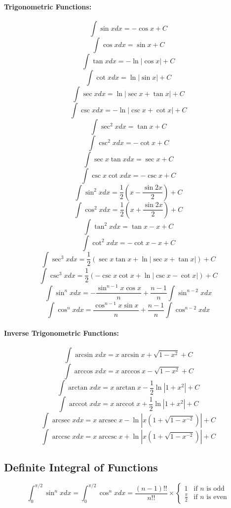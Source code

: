 \documentclass{article}
\begin{document}
\paragraph{Trigonometric Functions:}
\[
    \int \sin x dx = -\cos x + C
\]
\[
    \int \cos x dx = \sin x + C
\]
\[
    \int \tan x dx = -\ln|\cos x| + C
\]
\[
    \int \cot x dx = \ln|\sin x| + C
\]
\[
    \int \sec x dx = \ln|\sec x + \tan x| + C
\]
\[
    \int \csc x dx = -\ln|\csc x + \cot x| + C
\]
\[
    \int \sec^2 x dx = \tan x + C
\]
\[
    \int \csc^2 x dx = -\cot x + C
\]
\[
    \int \sec x \tan x dx = \sec x + C
\]
\[
    \int \csc x \cot x dx = -\csc x + C
\]
\[
    \int \sin^2 x dx = \frac{1}{2}\left(x - \frac{\sin 2x}{2}\right) + C
\]
\[
    \int \cos^2 x dx = \frac{1}{2}\left(x + \frac{\sin 2x}{2}\right) + C
\]
\[
    \int \tan^2 x dx = \tan x - x + C
\]
\[
    \int \cot^2 x dx = -\cot x - x + C
\]
\[
    \int \sec^3 x dx = \frac{1}{2}\left(\sec x \tan x + \ln|\sec x + \tan x|\right) + C
\]
\[
    \int \csc^3 x dx = \frac{1}{2}\left(-\csc x \cot x + \ln|\csc x - \cot x|\right) + C
\]
\[
    \int \sin^n x dx = -\frac{\sin^{n-1} x \cos x}{n} + \frac{n-1}{n} \int \sin^{n-2} x dx
\]
\[
    \int \cos^n x dx = \frac{\cos^{n-1} x \sin x}{n} + \frac{n-1}{n} \int \cos^{n-2} x dx
\]
\paragraph{Inverse Trigonometric Functions:}
\[
    \int \arcsin x dx = x \arcsin x + \sqrt{1 - x^2} + C
\]
\[
    \int \arccos x dx = x \arccos x - \sqrt{1 - x^2} + C
\]
\[
    \int \arctan x dx = x \arctan x - \frac{1}{2} \ln|1 + x^2| + C
\]
\[
    \int \operatorname{arccot} x dx = x \operatorname{arccot} x + \frac{1}{2} \ln|1 + x^2| + C
\]
\[
    \int \operatorname{arcsec} x dx = x \operatorname{arcsec} x - \ln|x(1 + \sqrt{1 - x^{-2}})| + C
\]
\[
    \int \operatorname{arccsc} x dx = x \operatorname{arccsc} x + \ln|x(1 + \sqrt{1 - x^{-2}})| + C
\]

\subsection{Definite Integral of Functions}

\[
    \int_0^{\pi/2} \sin^n x dx = \int_0^{\pi/2} \cos^n x dx = \frac{(n-1)!!}{n!!} \times
    \begin{cases}
        1 & \text{if } n \text{ is odd} \\
        \frac{\pi}{2} & \text{if } n \text{ is even}
    \end{cases}
\]
\end{document}
